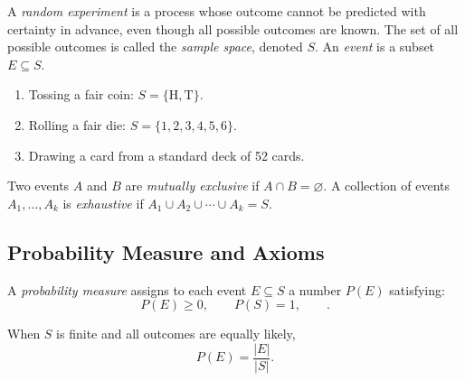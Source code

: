 A \emph{random experiment} is a process whose outcome cannot be predicted with
certainty in advance, even though all possible outcomes are known.
The set of all possible outcomes is called the \emph{sample space}, denoted $S$.
An \emph{event} is a subset $E \subseteq S$.

\begin{example}
\begin{enumerate}
  \item Tossing a fair coin: $S = \{\text{H}, \text{T}\}$.
  \item Rolling a fair die: $S = \{1,2,3,4,5,6\}$.
  \item Drawing a card from a standard deck of 52 cards.
\end{enumerate}
\end{example}

Two events $A$ and $B$ are \emph{mutually exclusive} if $A \cap B=\varnothing$.
A collection of events $A_1, \dots, A_k$ is \emph{exhaustive} if
$A_1 \cup A_2 \cup \cdots \cup A_k = S$.

\subsection{Probability Measure and Axioms}

A \emph{probability measure} assigns to each event $E\subseteq S$ a number
$P(E)$ satisfying:
\[
P(E)\ge 0,\qquad P(S)=1,\qquad.
\]

When $S$ is finite and all outcomes are equally likely,
\[
P(E)=\frac{|E|}{|S|}.
\]

